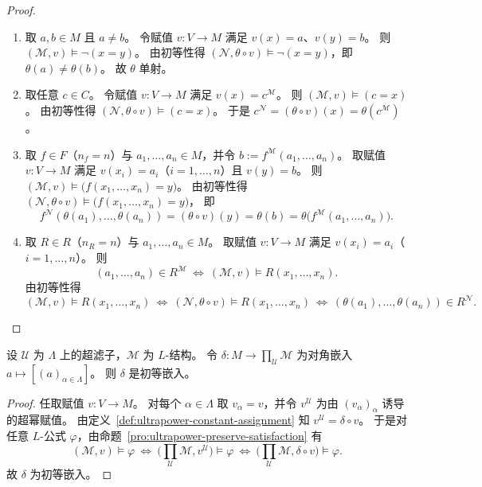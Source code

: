 \documentclass[lang=cn,a4paper,newtx,section]{elegantbook}
\begin{document}
\begin{proof}
\begin{enumerate}
  \item 取 $a,b\in M$ 且 $a\neq b$。
  令赋值 $v:V\to M$ 满足 $v(x)=a$、$v(y)=b$。
  则 $(\mathcal M,v)\models\neg(x=y)$。
  由初等性得 $(\mathcal N,\theta\circ v)\models\neg(x=y)$，即 $\theta(a)\neq\theta(b)$。
  故 $\theta$ 单射。
  \item 取任意 $c\in C$。
  令赋值 $v:V\to M$ 满足 $v(x)=c^{\mathcal M}$。
  则 $(\mathcal M,v)\models(c=x)$。
  由初等性得 $(\mathcal N,\theta\circ v)\models(c=x)$。
  于是 $c^{\mathcal N}=(\theta\circ v)(x)=\theta(c^{\mathcal M})$。
  \item 取 $f\in F$（$n_f=n$）与 $a_1,\dots,a_n\in M$，并令 $b:=f^{\mathcal M}(a_1,\dots,a_n)$。
  取赋值 $v:V\to M$ 满足 $v(x_i)=a_i$（$i=1,\dots,n$）且 $v(y)=b$。
  则 $(\mathcal M,v)\models\bigl(f(x_1,\dots,x_n)=y\bigr)$。
  由初等性得 $(\mathcal N,\theta\circ v)\models\bigl(f(x_1,\dots,x_n)=y\bigr)$，
  即
  \[
    f^{\mathcal N}(\theta(a_1),\dots,\theta(a_n))=(\theta\circ v)(y)=\theta(b)=\theta\bigl(f^{\mathcal M}(a_1,\dots,a_n)\bigr).
  \]
  \item 取 $R\in R$（$n_R=n$）与 $a_1,\dots,a_n\in M$。
  取赋值 $v:V\to M$ 满足 $v(x_i)=a_i$（$i=1,\dots,n$）。
  则
  \[
    (a_1,\dots,a_n)\in R^{\mathcal M}\ \Longleftrightarrow\ (\mathcal M,v)\models R(x_1,\dots,x_n).
  \]
  由初等性得
  \[
    (\mathcal M,v)\models R(x_1,\dots,x_n)\ \Longleftrightarrow\ (\mathcal N,\theta\circ v)\models R(x_1,\dots,x_n)
    \ \Longleftrightarrow\ (\theta(a_1),\dots,\theta(a_n))\in R^{\mathcal N}.
  \]
\end{enumerate}
\end{proof}

\begin{theorem}[对角嵌入是初等嵌入]
\label{diagonal-elementary}
设 $\mathcal U$ 为 $\Lambda$ 上的超滤子，$\mathcal M$ 为 $L$-结构。
令 $\delta:M\to\prod_{\mathcal U}\mathcal M$ 为对角嵌入 $a\mapsto[(a)_{\alpha\in\Lambda}]$。
则 $\delta$ 是初等嵌入。
\end{theorem}

\begin{proof}
任取赋值 $v:V\to M$。
对每个 $\alpha\in\Lambda$ 取 $v_{\alpha}=v$，并令 $v^{\mathcal U}$ 为由 $(v_{\alpha})_{\alpha}$ 诱导的超幂赋值。
由定义~\ref{def:ultrapower-constant-assignment} 知 $v^{\mathcal U}=\delta\circ v$。
于是对任意 $L$-公式 $\varphi$，由命题~\ref{pro:ultrapower-preserve-satisfaction} 有
\[
  (\mathcal M,v)\models\varphi\ \Longleftrightarrow\ \bigl(\prod_{\mathcal U}\mathcal M, v^{\mathcal U}\bigr)\models\varphi
  \ \Longleftrightarrow\ \bigl(\prod_{\mathcal U}\mathcal M, \delta\circ v\bigr)\models\varphi.
 \]
 故 $\delta$ 为初等嵌入。
 \end{proof}
 
\end{document}
